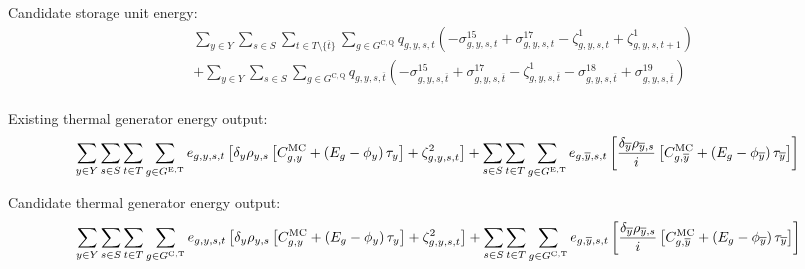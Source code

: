 \documentclass{article}
\newcommand{\sGeneratorsExistingThermal}{G^{\mathrm{E,T}}}
\newcommand{\sGeneratorsCandidateThermal}{G^{\mathrm{C,T}}}
\newcommand{\sStorageCandidate}{G^{\mathrm{C,Q}}}
\newcommand{\sYears}{Y}
\newcommand{\sScenarios}{S}
\newcommand{\sIntervals}{T}
\newcommand{\iGenerator}{g}
\newcommand{\iYear}{y}
\newcommand{\iYearTerminal}{\overline{\iYear}}
\newcommand{\iScenario}{s}
\newcommand{\iInterval}{t}
\newcommand{\iIntervalTerminal}{\overline{\iInterval}}
\newcommand{\cScenarioDuration}[1][\iYear,\iScenario]{\rho_{#1}}
\newcommand{\cMarginalCost}[1][\iGenerator,\iYear]{C^{\mathrm{MC}}_{#1}}
\newcommand{\cEmissionsIntensity}[1][\iGenerator]{E_{#1}}
\newcommand{\cInterestRate}{i}
\newcommand{\cDiscountRate}[1][\iYear]{\delta_{#1}}
\newcommand{\vBaseline}[1][\iYear]{\phi_{#1}}
\newcommand{\vPermitPrice}[1][\iYear]{\tau_{#1}}
\newcommand{\vEnergy}[1][\iGenerator,\iYear,\iScenario,\iInterval]{e_{#1}}
\newcommand{\vStorageUnitEnergy}[1][\iGenerator,\iYear,\iScenario,\iInterval]{q_{#1}}
\newcommand{\dNonNegativeStorageEnergy}[1][\iGenerator,\iYear,\iScenario,\iInterval]{\sigma_{#1}^{15}}
\newcommand{\dMaxStorageEnergyCandidate}[1][\iGenerator,\iYear,\iScenario,\iInterval]{\sigma_{#1}^{17}}
\newcommand{\dMinStorageEnergyIntervalEnd}[1][\iGenerator,\iYear,\iScenario,\iInterval]{\sigma_{#1}^{18}}
\newcommand{\dMaxStorageEnergyIntervalEnd}[1][\iGenerator,\iYear,\iScenario,\iInterval]{\sigma_{#1}^{19}}
\newcommand{\dStorageEnergyTransition}[1][\iGenerator,\iYear,\iScenario,\iInterval]{\zeta_{#1}^{1}}
\newcommand{\dGeneratorEnergyOutput}[1][\iGenerator,\iYear,\iScenario,\iInterval]{\zeta_{#1}^{2}}
\begin{document}
Candidate storage unit energy:
\begin{align}
	& \sum\limits_{\iYear \in \sYears}\sum\limits_{\iScenario \in \sScenarios} \sum\limits_{\iInterval \in \sIntervals \setminus \{\iIntervalTerminal\}} \sum\limits_{\iGenerator \in \sStorageCandidate} \vStorageUnitEnergy \left(- \dNonNegativeStorageEnergy + \dMaxStorageEnergyCandidate - \dStorageEnergyTransition + \dStorageEnergyTransition[\iGenerator,\iYear,\iScenario,\iInterval+1] \right)\\
	& + \sum\limits_{\iYear \in \sYears}\sum\limits_{\iScenario \in \sScenarios}\sum\limits_{\iGenerator \in \sStorageCandidate} \vStorageUnitEnergy[\iGenerator,\iYear,\iScenario,\iIntervalTerminal] \left(- \dNonNegativeStorageEnergy[\iGenerator,\iYear,\iScenario,\iIntervalTerminal] + \dMaxStorageEnergyCandidate[\iGenerator,\iYear,\iScenario,\iIntervalTerminal] - \dStorageEnergyTransition[\iGenerator,\iYear,\iScenario,\iIntervalTerminal] - \dMinStorageEnergyIntervalEnd[\iGenerator,\iYear,\iScenario,\iIntervalTerminal] + \dMaxStorageEnergyIntervalEnd[\iGenerator,\iYear,\iScenario,\iIntervalTerminal] \right)\\
\end{align}

Existing thermal generator energy output:
\begin{equation}
	\sumIntervals \sum\limits_{\iGenerator \in \sGeneratorsExistingThermal} \vEnergy \left[\cDiscountRate \cScenarioDuration \left[\cMarginalCost + \left(\cEmissionsIntensity - \vBaseline\right)\vPermitPrice \right]  + \dGeneratorEnergyOutput\right] + \sum\limits_{\iScenario \in \sScenarios} \sum\limits_{\iInterval \in \sIntervals} \sum\limits_{\iGenerator \in \sGeneratorsExistingThermal} \vEnergy[\iGenerator,\iYearTerminal,\iScenario,\iInterval] \left[ \frac{\cDiscountRate[\iYearTerminal] \cScenarioDuration[\iYearTerminal,\iScenario]}{\cInterestRate} \left[\cMarginalCost[\iGenerator,\iYearTerminal] + \left(\cEmissionsIntensity - \vBaseline[\iYearTerminal]\right)\vPermitPrice[\iYearTerminal] \right]\right]
\end{equation}

Candidate thermal generator energy output:
\begin{equation}
	\sumIntervals \sum\limits_{\iGenerator \in \sGeneratorsCandidateThermal} \vEnergy \left[\cDiscountRate \cScenarioDuration \left[\cMarginalCost + \left(\cEmissionsIntensity - \vBaseline\right)\vPermitPrice \right]  + \dGeneratorEnergyOutput\right] + \sum\limits_{\iScenario \in \sScenarios} \sum\limits_{\iInterval \in \sIntervals} \sum\limits_{\iGenerator \in \sGeneratorsCandidateThermal} \vEnergy[\iGenerator,\iYearTerminal,\iScenario,\iInterval] \left[ \frac{\cDiscountRate[\iYearTerminal] \cScenarioDuration[\iYearTerminal,\iScenario]}{\cInterestRate} \left[\cMarginalCost[\iGenerator,\iYearTerminal] + \left(\cEmissionsIntensity - \vBaseline[\iYearTerminal]\right)\vPermitPrice[\iYearTerminal] \right]\right]
\end{equation}
\end{document}
